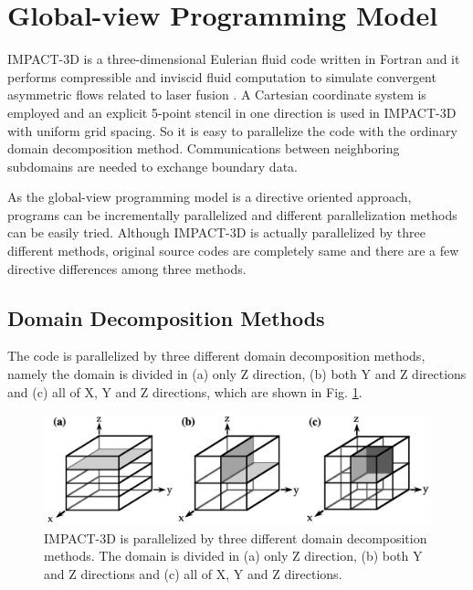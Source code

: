 \documentclass[graybox]{svmult}
\begin{document}
\section{Global-view Programming Model}
IMPACT-3D is a three-dimensional Eulerian fluid code written in Fortran and it performs compressible and inviscid fluid computation to simulate convergent asymmetric flows related to laser fusion \cite{SC02}. A Cartesian coordinate system is employed and an explicit 5-point stencil in one direction is used in IMPACT-3D with uniform grid spacing. So it is easy to parallelize the code with the ordinary domain decomposition method. Communications between neighboring subdomains are needed to exchange boundary data. 

As the global-view programming model is a directive oriented approach, programs can be incrementally parallelized and different parallelization methods can be easily tried. Although IMPACT-3D is actually parallelized by three different methods, original source codes are completely same and there are a few directive differences among three methods.

\subsection{Domain Decomposition Methods}
The code is parallelized by three different domain decomposition methods, namely the domain is divided in (a) only Z direction, (b) both Y and Z directions and (c) all of X, Y and Z directions, which are shown in Fig. \ref{fig6-1}. 

\begin{figure}[h]
\begin{center}
\includegraphics[width=11.5cm,bb=0 0 1633 470]{fig6-1.png}
\end{center}
\caption{IMPACT-3D is parallelized by three different domain decomposition methods. The domain is divided in (a) only Z direction, (b) both Y and Z directions and (c) all of X, Y and Z directions.}
\label{fig6-1} 
\end{figure}
\end{document}
